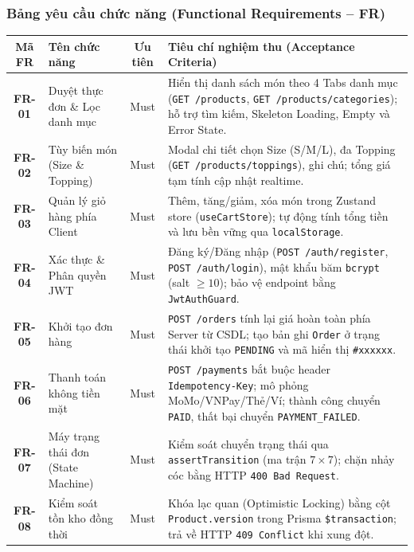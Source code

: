 \documentclass[a4paper,12pt]{article}
\begin{document}
\subsubsection{Bảng yêu cầu chức năng (Functional Requirements -- FR)}
\begin{table}[h!]
\centering
\scriptsize
\begin{tabularx}{\textwidth}{|c|l|c|X|}
\hline
\textbf{Mã FR} & \textbf{Tên chức năng} & \textbf{Ưu tiên} & \textbf{Tiêu chí nghiệm thu (Acceptance Criteria)} \\
\hline
\textbf{FR-01} & Duyệt thực đơn \& Lọc danh mục & Must & Hiển thị danh sách món theo 4 Tabs danh mục (\texttt{GET /products}, \texttt{GET /products/categories}); hỗ trợ tìm kiếm, Skeleton Loading, Empty và Error State. \\
\hline
\textbf{FR-02} & Tùy biến món (Size \& Topping) & Must & Modal chi tiết chọn Size (S/M/L), đa Topping (\texttt{GET /products/toppings}), ghi chú; tổng giá tạm tính cập nhật realtime. \\
\hline
\textbf{FR-03} & Quản lý giỏ hàng phía Client & Must & Thêm, tăng/giảm, xóa món trong Zustand store (\texttt{useCartStore}); tự động tính tổng tiền và lưu bền vững qua \texttt{localStorage}. \\
\hline
\textbf{FR-04} & Xác thực \& Phân quyền JWT & Must & Đăng ký/Đăng nhập (\texttt{POST /auth/register}, \texttt{POST /auth/login}), mật khẩu băm \texttt{bcrypt} (salt $\ge 10$); bảo vệ endpoint bằng \texttt{JwtAuthGuard}. \\
\hline
\textbf{FR-05} & Khởi tạo đơn hàng & Must & \texttt{POST /orders} tính lại giá hoàn toàn phía Server từ CSDL; tạo bản ghi \texttt{Order} ở trạng thái khởi tạo \texttt{PENDING} và mã hiển thị \texttt{\#xxxxxx}. \\
\hline
\textbf{FR-06} & Thanh toán không tiền mặt & Must & \texttt{POST /payments} bắt buộc header \texttt{Idempotency-Key}; mô phỏng MoMo/VNPay/Thẻ/Ví; thành công chuyển \texttt{PAID}, thất bại chuyển \texttt{PAYMENT\_FAILED}. \\
\hline
\textbf{FR-07} & Máy trạng thái đơn (State Machine)& Must & Kiểm soát chuyển trạng thái qua \texttt{assertTransition} (ma trận $7 \times 7$); chặn nhảy cóc bằng HTTP \texttt{400 Bad Request}. \\
\hline
\textbf{FR-08} & Kiểm soát tồn kho đồng thời & Must & Khóa lạc quan (Optimistic Locking) bằng cột \texttt{Product.version} trong Prisma \texttt{\$transaction}; trả về HTTP \texttt{409 Conflict} khi xung đột. \\
\hline

\end{tabularx}
\end{table}
\end{document}
